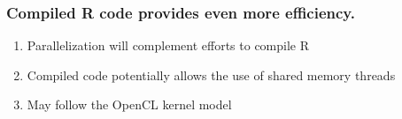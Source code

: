 \documentclass{beamer}
\begin{document}
\begin{frame}[fragile]
\end{frame}
\begin{frame}

    \frametitle{Compiled R code provides even more efficiency.}

\begin{enumerate}
    \item Parallelization will complement efforts to compile R
    \item Compiled code potentially allows the use of shared memory threads
    \item May follow the OpenCL kernel model
\end{enumerate}

\end{frame}
\end{document}
